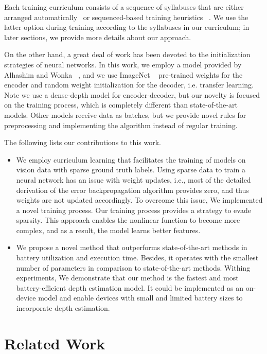\documentclass{article}
\begin{document}
Each training curriculum consists of a sequence of syllabuses that are either arranged automatically~\cite{graves2017automatic_curriculum} or sequenced-based training heuristics ~\cite{jiang2015self_paced_curriculum_learning}. We use the latter option during training according to the syllabuses in our curriculum; in later sections, we provide more details about our approach.

On the other hand, a great deal of work has been devoted to the initialization strategies of neural networks. In this work, we employ a model provided by Alhashim and Wonka ~\cite{alhashim2018high}, and we use ImageNet ~\cite{deng2009imagenet} pre-trained weights for the encoder and random weight initialization for the decoder, i.e. transfer learning. Note we use a dense-depth model for encoder-decoder, but our novelty is focused on the training process, which is completely different than state-of-the-art models. Other models receive data as batches, but we provide novel rules for preprocessing and implementing the algorithm instead of regular training. 


The following lists our contributions to this work.
\begin{itemize}
    \item We employ curriculum learning that facilitates the training of models on vision data with sparse ground truth labels. Using sparse data to train a neural network has an issue with weight updates, i.e., most of the detailed derivation of the error backpropagation algorithm provides zero, and thus  weights are not updated accordingly. To overcome this issue, We implemented a novel training process. Our training process provides a strategy to evade sparsity. This approach enables the nonlinear function to become more complex, and as a result, the model learns better features.
    \item We propose a novel method that outperforms state-of-the-art methods in battery utilization and execution time. Besides, it operates with the smallest number of parameters in comparison to state-of-the-art methods. Withing experiments, We demonstrate that our method is the fastest and most battery-efficient depth estimation model. It could be implemented as an on-device model and enable devices with small and limited battery sizes to incorporate depth estimation. 
\end{itemize}

\section{Related Work}
\label{sec:related_work}
\end{document}
